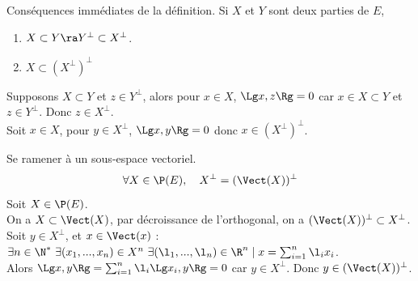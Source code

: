 \documentclass[11pt]{article}
\begin{document}
\pagebreak

\begin{ex}{Conséquences immédiates de la définition.}{}
    Si $X$ et $Y$ sont deux parties de $E$,
    \begin{enumerate}[topsep=0pt,itemsep=-0.9 ex]
        \item $X \subset Y \ra Y^\bot \subset X^\bot$.
        \item $X \subset (X^\bot)^\bot$
    \end{enumerate}
    \tcblower
     Supposons $X\subset Y$ et $z\in Y^\bot$, alors pour $x\in X$, $\Lg x, z \Rg = 0$ car $x\in X \subset Y$ et $z \in Y^\bot$. Donc $z\in X^\bot$.\\
     Soit $x\in X$, pour $y\in X^\bot$, $\Lg x, y \Rg = 0$ donc $x\in (X^\bot)^\bot$.
\end{ex}

\begin{ex}{Se ramener à un sous-espace vectoriel.}{}
    \begin{equation*}
        \forall X \in \P(E), \quad X^\bot = (\Vect(X))^\bot
    \end{equation*}
    \tcblower
    Soit $X\in\P(E)$.\\ 
    On a $X\subset\Vect(X)$, par décroissance de l'orthogonal, on a $(\Vect(X))^\bot\subset X^\bot$.\\
    Soit $y\in X^\bot$, et $x\in\Vect(x)$ : $\exists n \in \N^* ~ \exists (x_1,...,x_n)\in X^n ~ \exists (\l_1,...,\l_n) \in \R ^n \mid x = \sum_{i=1}^n\l_ix_i$.\\
    Alors $\Lg x, y \Rg = \sum_{i=1}^n\l_i\Lg x_i, y \Rg = 0$ car $y\in X^\bot$. Donc $y\in(\Vect(X))^\bot$.
\end{ex}
\end{document}
